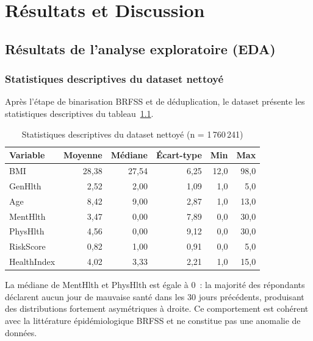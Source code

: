 \chapter{Résultats et Discussion}
\label{chap:resultats}

\section{Résultats de l'analyse exploratoire (EDA)}

\subsection{Statistiques descriptives du dataset nettoyé}

Après l'étape de binarisation BRFSS et de déduplication, le dataset présente
les statistiques descriptives du tableau~\ref{tab:stats_eda}.

\begin{table}[H]
\centering
\caption{Statistiques descriptives du dataset nettoyé (n = 1\,760\,241)}
\label{tab:stats_eda}
\begin{tabular}{lrrrrr}
\toprule
\textbf{Variable} & \textbf{Moyenne} & \textbf{Médiane} & \textbf{Écart-type} & \textbf{Min} & \textbf{Max} \\
\midrule
BMI            & 28,38 &  27,54 &  6,25 & 12,0 & 98,0 \\
GenHlth        &  2,52 &   2,00 &  1,09 &  1,0 &  5,0 \\
Age            &  8,42 &   9,00 &  2,87 &  1,0 & 13,0 \\
MentHlth       &  3,47 &   0,00 &  7,89 &  0,0 & 30,0 \\
PhysHlth       &  4,56 &   0,00 &  9,12 &  0,0 & 30,0 \\
RiskScore      &  0,82 &   1,00 &  0,91 &  0,0 &  5,0 \\
HealthIndex    &  4,02 &   3,33 &  2,21 &  1,0 & 15,0 \\
\bottomrule
\end{tabular}
\end{table}

La médiane de MentHlth et PhysHlth est égale à 0~: la majorité des répondants
déclarent aucun jour de mauvaise santé dans les 30 jours précédents, produisant
des distributions fortement asymétriques à droite. Ce comportement est cohérent
avec la littérature épidémiologique BRFSS et ne constitue pas une anomalie de données.

